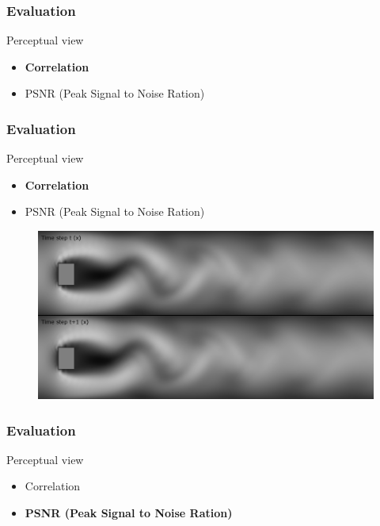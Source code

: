 \documentclass[18pt, xcolor=table]{beamer}
\begin{document}
\begin{frame}[t]
  \frametitle{Evaluation}
  \large{Perceptual view}
  \begin{itemize}
  \item \textbf{Correlation}
  \item PSNR (Peak Signal to Noise Ration)
  \end{itemize}
\end{frame}

\begin{frame}[t]
  \frametitle{Evaluation}
  \large{Perceptual view}
  \begin{itemize}
  \item \textbf{Correlation}
  \item PSNR (Peak Signal to Noise Ration)
  \end{itemize}
  \begin{center}
    \begin{figure}[htb]
      \includegraphics[scale=0.23]{images/final/vd_step}
    \end{figure}
  \end{center}
\end{frame}

\begin{frame}[t]
  \frametitle{Evaluation}
  \large{Perceptual view}
  \begin{itemize}
  \item Correlation
  \item \textbf{PSNR (Peak Signal to Noise Ration)}
  \end{itemize}
\end{frame}
\end{document}
